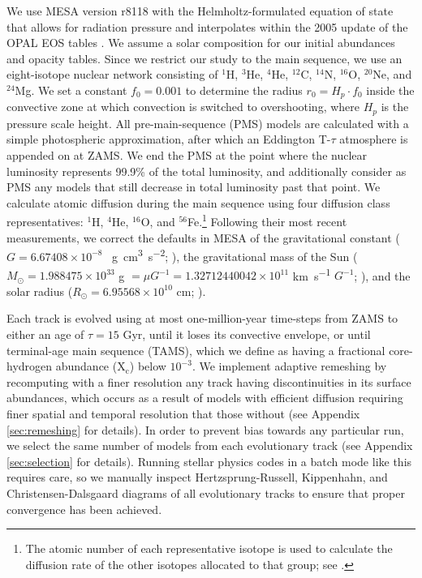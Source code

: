 \documentclass[manuscript]{aastex}
\begin{document}
We use MESA version r8118 with the Helmholtz-formulated equation of state that allows for radiation pressure and interpolates within the 2005 update of the OPAL EOS tables \citep{2002ApJ...576.1064R}. We assume a \citet{1998SSRv...85..161G} solar composition for our initial abundances and opacity tables. Since we restrict our study to the main sequence, we use an eight-isotope nuclear network consisting of $^1$H, $^3$He, $^4$He, $^{12}$C, $^{14}$N, $^{16}$O, $^{20}$Ne, and $^{24}$Mg. We set a constant $f_0 = 0.001$ to determine the radius $r_0 = H_p \cdot f_0$ inside the convective zone at which convection is switched to overshooting, where $H_p$ is the pressure scale height. All pre-main-sequence (PMS) models are calculated with a simple photospheric approximation, after which an Eddington T-$\tau$ atmosphere is appended on at ZAMS. We end the PMS at the point where the nuclear luminosity represents 99.9\% of the total luminosity, and additionally consider as PMS any models that still decrease in total luminosity past that point. %
We calculate atomic diffusion during the main sequence using four diffusion class representatives: $^1$H, $^4$He, $^{16}$O, and $^{56}$Fe.\footnote{The atomic number of each representative isotope is used to calculate the diffusion rate of the other isotopes allocated to that group; see \citealt{Paxton2011}.} 
Following their most recent measurements, we correct the defaults in MESA of the gravitational constant ($G=6.67408\times 10^{-8}$ \si{\per\g\cm\cubed\per\square\s}; \citealt{2015arXiv150707956M}), the gravitational mass of the Sun ($M_\odot = 1.988475\times 10^{33}$ \si{\g} $= \mu G^{-1} = 1.32712440042\times 10^{11}$ \si{\km\per\s} $G^{-1}$; \citealt{pitjeva2015determination}), and the solar radius ($R_\odot = 6.95568\times 10^{10}$ \si{\cm}; \citealt{2008ApJ...675L..53H}). 

Each track is evolved using at most one-million-year time-steps from ZAMS to either an age of $\tau=15$ Gyr, until it loses its convective envelope, or until terminal-age main sequence (TAMS), which we define as having a fractional core-hydrogen abundance (X$_{\text{c}}$) below $10^{-3}$. We implement adaptive remeshing by recomputing with a finer resolution any track having discontinuities in its surface abundances, which occurs as a result of models with efficient diffusion requiring finer spatial and temporal resolution that those without (see Appendix \ref{sec:remeshing} for details). In order to prevent bias towards any particular run, we select the same number of models from each evolutionary track (see Appendix \ref{sec:selection} for details). Running stellar physics codes in a batch mode like this requires care, so we manually inspect Hertzsprung-Russell, Kippenhahn, and Christensen-Dalsgaard diagrams of all evolutionary tracks to ensure that proper convergence has been achieved. %
\end{document}
